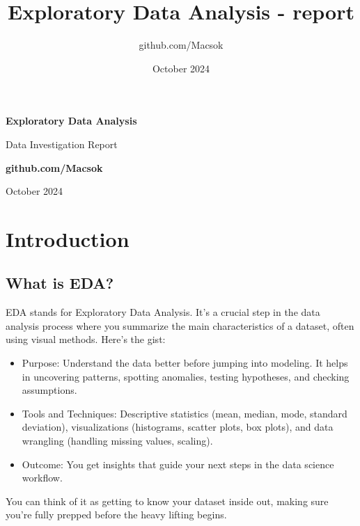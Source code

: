 \documentclass[a4paper]{article}
\title{Exploratory Data Analysis - report}
\author{github.com/Macsok}
\date{October 2024}
\begin{document}
\begin{titlepage}
   \begin{center}
        \vspace*{4cm}

        \Huge
        \textbf{Exploratory Data Analysis}
        \vspace{0.5cm}

        \LARGE
        Data Investigation Report
        \vspace{2.5cm}
       
        \textbf{github.com/Macsok}

        \Large
        \vfill
        October 2024   
   \end{center}
\end{titlepage}




\newpage
\tableofcontents
\newpage

\section{Introduction}
\subsection{What is EDA?}
EDA stands for Exploratory Data Analysis. It’s a crucial step in the data analysis process where you summarize the main characteristics of a dataset, often using visual methods. Here’s the gist:
    \begin{itemize}
        \item Purpose: Understand the data better before jumping into modeling. It helps in uncovering patterns, spotting anomalies, testing hypotheses, and checking assumptions.

        \item Tools and Techniques: Descriptive statistics (mean, median, mode, standard deviation), visualizations (histograms, scatter plots, box plots), and data wrangling (handling missing values, scaling).

        \item Outcome: You get insights that guide your next steps in the data science workflow.
    \end{itemize}
You can think of it as getting to know your dataset inside out, making sure you’re fully prepped before the heavy lifting begins.
\end{document}
